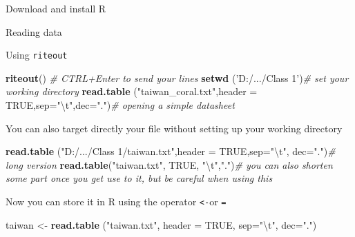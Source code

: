 \documentclass[
  ignorenonframetext,
]{beamer}
\newenvironment{Shaded}{\begin{snugshade}}{\end{snugshade}}
\newcommand{\CharTok}[1]{\textcolor[rgb]{0.31,0.60,0.02}{#1}}
\newcommand{\CommentTok}[1]{\textcolor[rgb]{0.56,0.35,0.01}{\textit{#1}}}
\newcommand{\DataTypeTok}[1]{\textcolor[rgb]{0.13,0.29,0.53}{#1}}
\newcommand{\KeywordTok}[1]{\textcolor[rgb]{0.13,0.29,0.53}{\textbf{#1}}}
\newcommand{\NormalTok}[1]{#1}
\newcommand{\OtherTok}[1]{\textcolor[rgb]{0.56,0.35,0.01}{#1}}
\newcommand{\StringTok}[1]{\textcolor[rgb]{0.31,0.60,0.02}{#1}}
\begin{document}
\begin{frame}[fragile]{Download and install R}
\begin{block}{Reading data}

Using {\texttt{riteout}}

\begin{Shaded}
\begin{Highlighting}[]
\KeywordTok{riteout}\NormalTok{() }\CommentTok{# CTRL+Enter to send your lines}
\KeywordTok{setwd}\NormalTok{ (}\StringTok{'D:/.../Class 1'}\NormalTok{)}\CommentTok{# set your working directory}
\KeywordTok{read.table}\NormalTok{ (}\StringTok{"taiwan_coral.txt"}\NormalTok{,}\DataTypeTok{header =} \OtherTok{TRUE}\NormalTok{,}\DataTypeTok{sep=}\StringTok{"}\CharTok{\textbackslash{}t}\StringTok{"}\NormalTok{,}\DataTypeTok{dec=}\StringTok{"."}\NormalTok{)}\CommentTok{# opening a simple datasheet}
\end{Highlighting}
\end{Shaded}

{ You can also target directly your file without setting up your working
directory }

\begin{Shaded}
\begin{Highlighting}[]
\KeywordTok{read.table}\NormalTok{ (}\StringTok{"D:/.../Class 1/taiwan.txt"}\NormalTok{,}\DataTypeTok{header =} \OtherTok{TRUE}\NormalTok{,}\DataTypeTok{sep=}\StringTok{"}\CharTok{\textbackslash{}t}\StringTok{"}\NormalTok{, }\DataTypeTok{dec=}\StringTok{"."}\NormalTok{)}\CommentTok{# long version}
\KeywordTok{read.table}\NormalTok{(}\StringTok{"taiwan.txt"}\NormalTok{, }\OtherTok{TRUE}\NormalTok{, }\StringTok{"}\CharTok{\textbackslash{}t}\StringTok{"}\NormalTok{,}\StringTok{"."}\NormalTok{)}\CommentTok{# you can also shorten some part once you get use to it, but be careful when using this}
\end{Highlighting}
\end{Shaded}

{ Now you can store it in R using the operator}
{\texttt{\textless{}-}}{or} {\texttt{=}}

\begin{Shaded}
\begin{Highlighting}[]
\NormalTok{taiwan <-}\StringTok{ }\KeywordTok{read.table}\NormalTok{ (}\StringTok{"taiwan.txt"}\NormalTok{,     }\DataTypeTok{header =} \OtherTok{TRUE}\NormalTok{, }\DataTypeTok{sep=}\StringTok{"}\CharTok{\textbackslash{}t}\StringTok{"}\NormalTok{, }\DataTypeTok{dec=}\StringTok{"."}\NormalTok{)}
\end{Highlighting}
\end{Shaded}


\end{block}
\end{frame}
\end{document}
